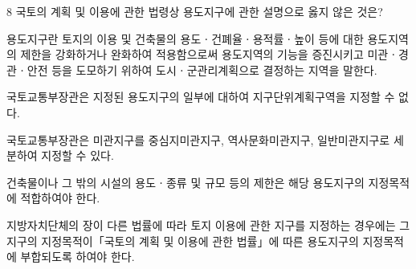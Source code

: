 \begin{question}{8}
국토의 계획 및 이용에 관한 법령상 용도지구에 관한 설명으로 옳지 않은 것은?
\begin{choices}
  \item 용도지구란 토지의 이용 및 건축물의 용도ㆍ건폐율ㆍ용적률ㆍ높이 등에 대한 용도지역의 제한을 강화하거나 완화하여 적용함으로써 용도지역의 기능을 증진시키고 미관ㆍ경관ㆍ안전 등을 도모하기 위하여 도시ㆍ군관리계획으로 결정하는 지역을 말한다.
  \item 국토교통부장관은 지정된 용도지구의 일부에 대하여 지구단위계획구역을 지정할 수 없다.
  \item 국토교통부장관은 미관지구를 중심지미관지구, 역사문화미관지구, 일반미관지구로 세분하여 지정할 수 있다.
  \item 건축물이나 그 밖의 시설의 용도ㆍ종류 및 규모 등의 제한은 해당 용도지구의 지정목적에 적합하여야 한다.
  \item 지방자치단체의 장이 다른 법률에 따라 토지 이용에 관한 지구를 지정하는 경우에는 그 지구의 지정목적이「국토의 계획 및 이용에 관한 법률」에 따른 용도지구의 지정목적에 부합되도록 하여야 한다.
\end{choices}
\end{question}
